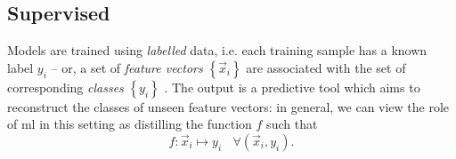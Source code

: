 \subsection{Supervised }
Models are trained using \emph{labelled} data, 
    i.e. each training sample has a known label $y_i$ -- 
    or, a set of \emph{feature vectors} $\left\{\vec{x}_i\right\}$ are associated with the set of 
    corresponding \emph{classes} $\left\{ y_i \right\}$ \cite{caruana2006empirical}. 
The output is a predictive tool which aims to reconstruct the classes of unseen feature vectors:
    in general, we can view the role of \gls{ml} in this setting as distilling the function $f$ such that 
\begin{equation}
    \label{eqn:supervised_ml_target}
    f : \vec{x}_i \longmapsto y_i \ \ \ \  \forall (\vec{x}_i, y_i).
\end{equation}
\par 

\par 

